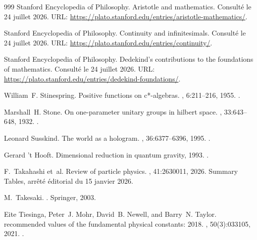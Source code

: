 \begin{thebibliography}{999}
{Stanford Encyclopedia of Philosophy}.
\newblock Aristotle and mathematics.
\newblock Consulté le 24 juillet 2026.
\newblock URL: \url{https://plato.stanford.edu/entries/aristotle-mathematics/}.

{Stanford Encyclopedia of Philosophy}.
\newblock Continuity and infinitesimals.
\newblock Consulté le 24 juillet 2026.
\newblock URL: \url{https://plato.stanford.edu/entries/continuity/}.

{Stanford Encyclopedia of Philosophy}.
\newblock Dedekind's contributions to the foundations of mathematics.
\newblock Consulté le 24 juillet 2026.
\newblock URL: \url{https://plato.stanford.edu/entries/dedekind-foundations/}.

William~F. Stinespring.
\newblock Positive functions on c*-algebras.
, 6:211--216,
  1955.
\newblock \href {https://doi.org/10.1090/S0002-9939-1955-0069403-4}
  {}.

Marshall~H. Stone.
\newblock On one-parameter unitary groups in hilbert space.
, 33:643--648, 1932.
\newblock \href {https://doi.org/10.2307/1968538} {}.

Leonard Susskind.
\newblock The world as a hologram.
, 36:6377--6396, 1995.
\newblock \href {https://arxiv.org/abs/hep-th/9409089}
  {}.

Gerard {'t Hooft}.
\newblock Dimensional reduction in quantum gravity, 1993.
\newblock \href {https://arxiv.org/abs/gr-qc/9310026}
  {}.

F.~Takahashi et~al.
\newblock Review of particle physics.
, 41:2630011, 2026.
\newblock Summary Tables, arrêté éditorial du 15 janvier 2026.

M.~Takesaki.
.
\newblock Springer, 2003.

Eite Tiesinga, Peter~J. Mohr, David~B. Newell, and Barry~N. Taylor.
 recommended values of the fundamental physical constants:
  2018.
, 50(3):033105,
  2021.
\newblock \href {https://doi.org/10.1063/5.0064853}
  {}.


\end{thebibliography}
